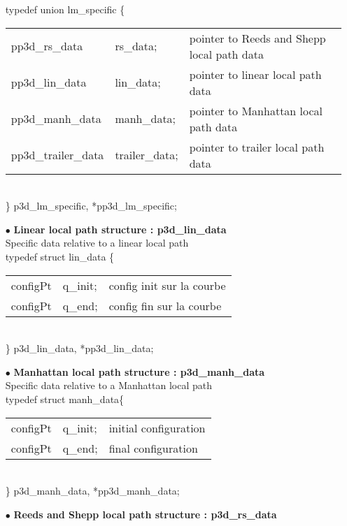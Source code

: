 \begin{itemize}
typedef union lm\_specific \{\\
\begin{tabular}{lll}
  pp3d\_rs\_data & rs\_data; & pointer to Reeds and Shepp local path data \\
  pp3d\_lin\_data &lin\_data; & pointer to linear local path data \\
  pp3d\_manh\_data &manh\_data;& pointer to Manhattan local path data \\
  pp3d\_trailer\_data &trailer\_data; & pointer to trailer local path
  data \\
\end{tabular}\\
\} p3d\_lm\_specific, *pp3d\_lm\_specific;

\item[$\bullet$]{\bf Linear local path structure : p3d\_lin\_data} 
\\

Specific data relative to a linear local path\\
typedef struct lin\_data \{\\
\begin{tabular}{lll}
  configPt &q\_init;     &config init sur la courbe   \\
  configPt &q\_end;       &config fin  sur la courbe  \\
\end{tabular}\\
\} p3d\_lin\_data, *pp3d\_lin\_data;\\


\item[$\bullet$]{\bf Manhattan local path structure : p3d\_manh\_data} 
\\

Specific data relative to a Manhattan local path\\
typedef struct manh\_data\{\\
\begin{tabular}{lll}
  configPt &q\_init;     &initial configuration   \\
  configPt &q\_end;       &final configuration  \\
\end{tabular}\\
\} p3d\_manh\_data, *pp3d\_manh\_data;\\


\item[$\bullet$]{\bf Reeds and Shepp local path structure : p3d\_rs\_data} 
\\


\end{itemize}
